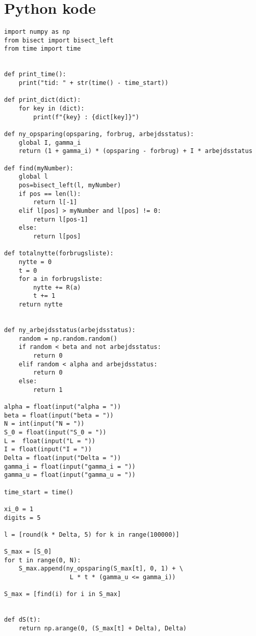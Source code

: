 \section{Python kode}\label{Bilag:python_kode}
\lstset{language=Python}
\lstset{frame=lines}
\lstset{numbers=left}
\lstset{stepnumber=1}
\lstset{firstnumber=1}
\lstset{numberfirstline=false}
\lstset{basicstyle=\footnotesize}
\begin{lstlisting}[mathescape=true,caption={Python algoritme},label={kode:python}]
import numpy as np
from bisect import bisect_left
from time import time


def print_time():
    print("tid: " + str(time() - time_start))

def print_dict(dict):
    for key in (dict):
        print(f"{key} : {dict[key]}")

def ny_opsparing(opsparing, forbrug, arbejdsstatus):
    global I, gamma_i
    return (1 + gamma_i) * (opsparing - forbrug) + I * arbejdsstatus

def find(myNumber):
    global l
    pos=bisect_left(l, myNumber)
    if pos == len(l):
        return l[-1]
    elif l[pos] > myNumber and l[pos] != 0:
        return l[pos-1]
    else:
        return l[pos]

def totalnytte(forbrugsliste):
    nytte = 0
    t = 0
    for a in forbrugsliste:
        nytte += R(a)
        t += 1
    return nytte


def ny_arbejdsstatus(arbejdsstatus):
    random = np.random.random()
    if random < beta and not arbejdsstatus:
        return 0
    elif random < alpha and arbejdsstatus:
        return 0
    else:
        return 1

alpha = float(input("alpha = "))
beta = float(input("beta = "))
N = int(input("N = "))
S_0 = float(input("S_0 = "))
L =  float(input("L = "))
I = float(input("I = "))
Delta = float(input("Delta = "))
gamma_i = float(input("gamma_i = "))
gamma_u = float(input("gamma_u = "))

time_start = time()

xi_0 = 1
digits = 5

l = [round(k * Delta, 5) for k in range(100000)]

S_max = [S_0]
for t in range(0, N):
    S_max.append(ny_opsparing(S_max[t], 0, 1) + \
                  L * t * (gamma_u <= gamma_i))

S_max = [find(i) for i in S_max] 


def dS(t):
    return np.arange(0, (S_max[t] + Delta), Delta)


\end{lstlisting}
